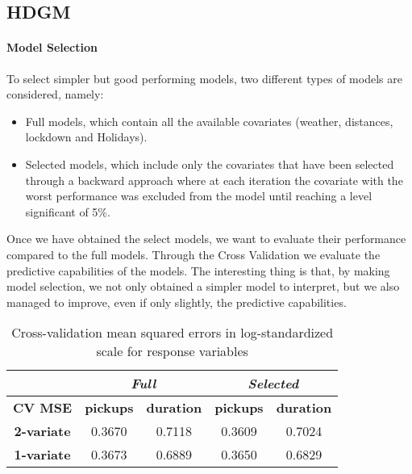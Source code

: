 \subsection{HDGM}
\paragraph{Model Selection} To select simpler but good performing models, two different types of models are considered, namely:
\begin{itemize}
	\item Full models, which contain all the available covariates (weather, distances, lockdown and Holidays).
	\item Selected models, which include only the covariates that have been selected through a backward approach where at each iteration the covariate with the worst performance was excluded from the model until reaching a level significant of \num{5}\%.
\end{itemize}
Once we have obtained the select models, we want to evaluate their performance compared to the full models. Through the Cross Validation we evaluate the predictive capabilities of the models. The interesting thing is that, by making model selection, we not only obtained a simpler model to interpret, but we also managed to improve, even if only slightly, the predictive capabilities. 
\begin{table}[h!]
	\centering
	\begin{tabular}{c|cc|cc}
		\hline
		\multicolumn{1}{l|}{} & \multicolumn{2}{c|}{\textit{Full}} & \multicolumn{2}{c}{\textit{Selected} }\\ 
		\hline
		\textbf{CV MSE} & \multicolumn{1}{c|}{\textbf{pickups }} & \textbf{duration} & \multicolumn{1}{c|}{\textbf{pickups}} & \textbf{duration} \\ 
		\hline
		\textbf{2-variate } & \multicolumn{1}{c|}{0.3670}  & 0.7118   & \multicolumn{1}{c|}{0.3609}  & 0.7024   \\ 
		\hline
		\textbf{1-variate } & \multicolumn{1}{c|}{0.3673}  & 0.6889   & \multicolumn{1}{c|}{0.3650}  & 0.6829   \\ 
		\hline
	\end{tabular}
	\caption{Cross-validation mean squared errors in log-standardized scale for response variables}
	\label{Cross-validation mean squared errors HDGM}
\end{table}

